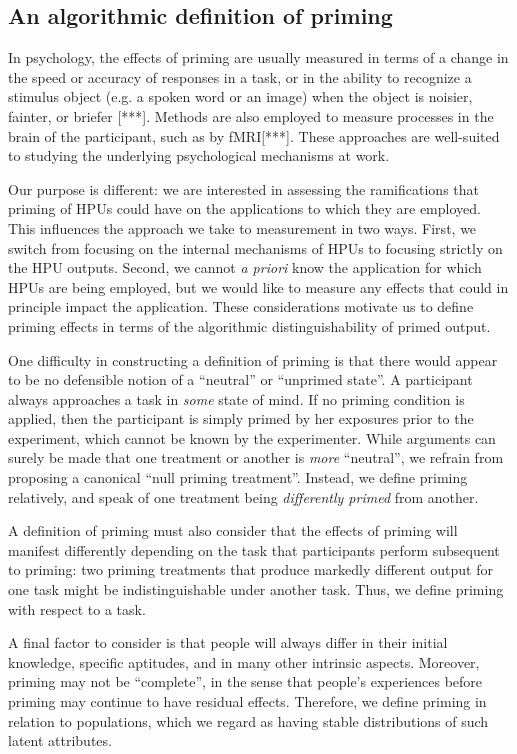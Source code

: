\documentclass[a4paper]{report}
\begin{document}
\subsection*{An algorithmic definition of priming}

In psychology, the effects of priming are usually measured in terms of a 
change in the  
speed or accuracy of responses in a task, or in the ability to recognize a 
stimulus object (e.g. a spoken word or an image) when the object is noisier, 
fainter, or briefer [***].  Methods are also employed to measure processes
in the brain of the participant, such as by fMRI[***].  These approaches are 
well-suited to studying the underlying psychological mechanisms at work.

Our purpose is different: we are interested in assessing the ramifications
that priming of HPUs could have on the applications to which they are employed.
This influences the approach we take to measurement in two ways.  First, we 
switch from focusing on the internal mechanisms of HPUs to focusing strictly 
on the HPU outputs.  Second, we cannot \textit{a priori} know the 
application for which HPUs are being employed, but we would like to measure 
any effects that could in principle impact the application.  These 
considerations motivate us to define priming effects in terms of the 
algorithmic distinguishability of primed output.

One difficulty in constructing a definition of priming is that there would 
appear to be no defensible notion of a ``neutral'' or ``unprimed state''.  A 
participant 
always approaches a task in \textit{some} state of mind.  If no priming 
condition is applied, then the participant is simply primed by her
exposures prior to the experiment, which cannot be known by the experimenter.  
While arguments can surely be made that one treatment or another is 
\textit{more} 
``neutral'', we refrain from proposing a canonical ``null priming treatment''. 
Instead, we define priming relatively, and speak of one treatment being 
\textit{differently primed} from another.

A definition of priming must also consider that the effects of priming will
manifest differently depending on the task that participants perform 
subsequent to priming:  two priming treatments that
produce markedly different output for one task might be 
indistinguishable under another task.  Thus, we define priming
with respect to a task.

A final factor to consider is that people will always differ in their initial
knowledge, specific aptitudes, and in many other intrinsic aspects.  Moreover,
priming may not be ``complete'', in the sense that people's experiences before
priming may continue to have residual effects.  Therefore, we define priming 
in relation to populations, which we regard as having stable distributions of
such latent attributes.
\end{document}
